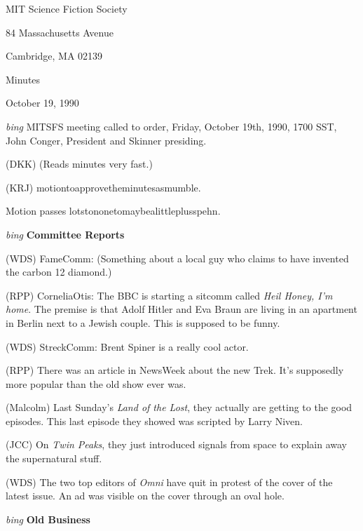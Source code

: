 \setlength{\topmargin}{-0.5in}
\setlength{\oddsidemargin}{0.0in}
\setlength{\evensidemargin}{0.0in}
\setlength{\textheight}{9in}
\setlength{\textwidth}{6.5in}



\begin{center}
MIT Science Fiction Society

84 Massachusetts Avenue

Cambridge, MA 02139

\vspace{0.2in}
Minutes

October 19, 1990

\end{center}
 
\vspace{0.15in}
{\em bing\/}  MITSFS meeting called to order, Friday, October 19th, 1990,
1700 SST, John Conger, President and Skinner presiding.

(DKK) (Reads minutes very fast.)

(KRJ) motiontoapprovetheminutesasmumble.

Motion passes lotstononetomaybealittleplusspehn.

\vspace{0.15in}
{\em bing\/} {\bf Committee Reports\/}

(WDS) FameComm: (Something about a local guy who claims to have invented the
carbon 12 diamond.)

(RPP) CorneliaOtis: The BBC is starting a sitcomm called {\em Heil Honey, I'm
home\/}.  The premise is that Adolf Hitler and Eva Braun are living in an
apartment in Berlin next to a Jewish couple.  This is supposed to be funny.

(WDS) StreckComm: Brent Spiner is a really cool actor.

(RPP) There was an article in NewsWeek about the new Trek.  It's supposedly
more popular than the old show ever was.

(Malcolm) Last Sunday's {\em Land of the Lost\/}, they actually are getting to
the good episodes.  This last episode they showed was scripted by Larry Niven.

(JCC) On {\em Twin Peaks\/}, they just introduced signals from space to
explain away the supernatural stuff.

(WDS) The two top editors of {\em Omni\/} have quit in protest of the cover of
the latest issue.  An ad was visible on the cover through an oval hole.

\vspace{.15in}
{\em bing\/} {\bf Old Business\/}

